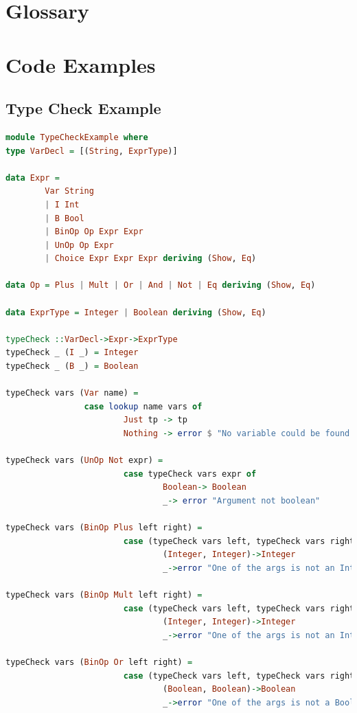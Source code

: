 \documentclass{article}
\begin{document}
    \appendix
    \section{Glossary}
    \printnoidxglossaries

    \section{Code Examples}
    \subsection{Type Check Example}
    \begin{lstlisting}[language=Haskell]
module TypeCheckExample where
type VarDecl = [(String, ExprType)]

data Expr = 
        Var String
        | I Int
        | B Bool
        | BinOp Op Expr Expr
        | UnOp Op Expr
        | Choice Expr Expr Expr deriving (Show, Eq)
            
data Op = Plus | Mult | Or | And | Not | Eq deriving (Show, Eq)

data ExprType = Integer | Boolean deriving (Show, Eq)

typeCheck ::VarDecl->Expr->ExprType
typeCheck _ (I _) = Integer
typeCheck _ (B _) = Boolean

typeCheck vars (Var name) = 
                case lookup name vars of
                        Just tp -> tp
                        Nothing -> error $ "No variable could be found named "++name

typeCheck vars (UnOp Not expr) = 
                        case typeCheck vars expr of
                                Boolean-> Boolean 
                                _-> error "Argument not boolean"

typeCheck vars (BinOp Plus left right) = 
                        case (typeCheck vars left, typeCheck vars right) of
                                (Integer, Integer)->Integer
                                _->error "One of the args is not an Integer"

typeCheck vars (BinOp Mult left right) = 
                        case (typeCheck vars left, typeCheck vars right) of
                                (Integer, Integer)->Integer
                                _->error "One of the args is not an Integer"

typeCheck vars (BinOp Or left right) = 
                        case (typeCheck vars left, typeCheck vars right) of
                                (Boolean, Boolean)->Boolean
                                _->error "One of the args is not a Boolean"


\end{lstlisting}
\end{document}
